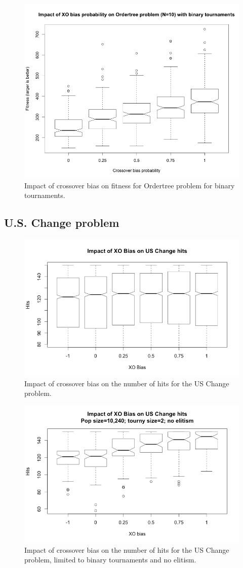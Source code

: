 \documentclass{sig-alternate}
\begin{document}
\begin{figure}
\centering
\includegraphics[width=0.45 \textwidth]{Plots/Ordertree_XO_bias_prob_binary_tournaments.png}
\caption{Impact of crossover bias on fitness for Ordertree problem for binary tournaments.}
\label{fig:Ordertree_results_binary_tournaments}
\end{figure}

\subsection{U.S. Change problem}

\begin{figure}
\centering
\includegraphics[width=0.45 \textwidth]{Plots/US_change_hits.png}
\caption{Impact of crossover bias on the number of hits for the US Change problem.}
\label{fig:USChange_Hits}
\end{figure}

\begin{figure}
\centering
\includegraphics[width=0.45 \textwidth]{Plots/US_change_hits_tourny2_noElitism.png}
\caption{Impact of crossover bias on the number of hits for the US Change problem, limited to binary 
tournaments and no elitism.}
\label{fig:USChange_Hits_tourny2_noElitism}
\end{figure}
\end{document}
